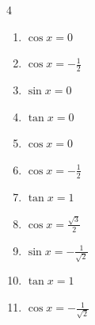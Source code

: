 \begin{multicols}{4}
\begin{enumerate}

  \item $\displaystyle \cos{x}  = 0$


  \item $\displaystyle \cos{x}  = -\frac{1}{2}$


  \item $\displaystyle \sin{x}  = 0$

        \phantom{$\displaystyle x = 0 , \pi$}

  \item $\displaystyle \tan{x}  = 0$

        \phantom{$\displaystyle x = 0 , \pi$}

  \item $\displaystyle \cos{x}  = 0$


\columnbreak %

\resetques

  \item $\displaystyle \cos{x}  = -\frac{1}{2}$


  \item $\displaystyle \tan{x}  = 1$


  \item $\displaystyle \cos{x}  = \frac{\sqrt{3}}{2}$


  \item $\displaystyle \sin{x}  = -\frac{1}{\sqrt{2}}$


  \item $\displaystyle \tan{x}  = 1$


  \item $\displaystyle \cos{x}  = -\frac{1}{\sqrt{2}}$


\end{enumerate}
\end{multicols}
